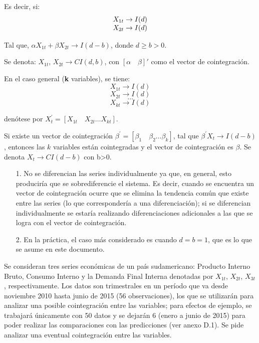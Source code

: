 Es decir, si:
\[
{\begin{array}{*{20}c}
X_{1t}\to I(d)\\
X_{2t}\to I(d)\\
\end{array} }
\]

Tal que, $\alpha X_{1t}+\beta X_{2t}\to I(d-b)$, donde $d\geq b>0$.\newline

Se denota: $X_{1t}$, $X_{2t}\to CI(d,b)$, con $[\alpha \quad \beta ]'$ como el vector de cointegraci\'{o}n.\newline

En el caso general (\textbf{k} variables), se tiene:
\[
X_{1t} \to I(d)
\]
\[
X_{2t} \to I(d)
\]
\[
\ldots
\]
\[
X_{kt} \to I(d)
\]

den\'{o}tese por $X_{t}^{'}=\left[ X_{1t}\quad X_{2t}\ldots X_{kt}\right]$.\newline

Si existe un vector de cointegraci\'{o}n $\beta^{'}=\left[ \beta_{1}\quad \beta_{2}\ldots\beta_{k} \right]$, tal que $\beta^{'}X_{t}\to I(d-b)$, entonces las $k$ variables est\'{a}n cointegradas y el vector de cointegraci\'{o}n es $\beta$. Se denota $X_{t}\to CI(d-b)$ con b>0.

\begin{observacion}
\quad
\begin{enumerate}
      \item[1.] No se diferencian las series individualmente ya que, en general, esto producir\'{i}a que se sobrediferencie el sistema. Es decir, cuando se encuentra un vector de cointegraci\'{o}n ocurre que se elimina la tendencia com\'{u}n que existe entre las series (lo que corresponder\'{i}a a una diferenciaci\'{o}n); si se diferencian individualmente se estar\'{i}a realizando diferenciaciones adicionales a las que se logra con el vector de cointegraci\'{o}n.
      \item[2.] En la pr\'{a}ctica, el caso m\'{a}s considerado es cuando $d=b=1$, que es lo que se asume en este documento.
\end{enumerate}
\end{observacion}

\begin{ejemplo}
Se consideran tres series econ\'{o}micas de un pa\'{i}s sudamericano: Producto Interno Bruto, Consumo Interno y la Demanda Final Interna denotadas por $X_{1t}$, $X_{2t}$, $X_{3t}$, respectivamente. Los datos son trimestrales en un per\'{i}odo que va desde noviembre 2010 hasta junio de 2015 (56 observaciones), los que se utilizar\'{a}n para analizar una posible cointegraci\'{o}n entre las variables; para efectos de ejemplo, se trabajar\'{a} \'{u}nicamente con 50 datos y se dejar\'{a}n 6 (enero a junio de 2015) para poder realizar las comparaciones con las predicciones (ver anexo D.1). Se pide analizar una eventual cointegraci\'{o}n entre las variables.
\end{ejemplo}


